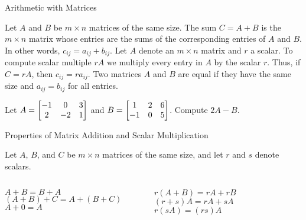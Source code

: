 \documentclass[xcolor=dvipsnames,aspectratio=169,t]{beamer}
\begin{document}
\begin{frame}{Arithmetic with Matrices}

  {\small
  \bi
  \ii Let $A$ and $B$ be $m \times n$ matrices of the same size. The \alert{sum $C=A + B$} is the $m \times n$ matrix whose entries are the sums of the corresponding entries of $A$ and $B$. In other words, $c_{ij} = a_{ij}+b_{ij}$.
  \ii Let $A$ denote an $m \times n$ matrix and $r$ a scalar. To compute \alert{scalar multiple $rA$} we multiply every entry in $A$ by the scalar $r$. Thus, if $C = rA$, then $c_{ij} = r a_{ij}$.
  \ii Two matrices $A$ and $B$ are equal if they have the same size and $a_{ij}=b_{ij}$ for all entries.
  \ei
  }

  \pause
  \begin{example}
  Let $\displaystyle A = \begin{bmatrix} -1 & 0 & 3\\ 2 & -2 & 1 \end{bmatrix}$ and $\displaystyle B = \begin{bmatrix} 1 & 2 & 6\\ -1 & 0 & 5 \end{bmatrix}$.  Compute $2A - B$.
  \end{example}
\end{frame}

\begin{frame}{Properties of Matrix Addition and Scalar Multiplication}

\bbox
Let $A$, $B$, and $C$ be $m \times n$ matrices of the same size, and let $r$ and $s$ denote scalars.

\begin{columns}[T]
\column{0.5\tw}
\bb[a.]
\ii $A+B = B+A$
\ii $(A+B)+C = A+(B+C)$
\ii $A + 0 = A$
\ee

\column{0.5\tw}
\bb[a.]
\addtocounter{enumi}{3}
\ii $r(A+B) = rA + rB$
\ii $(r+s) A = rA + sA$
\ii $r(sA) = (rs)A$
\ee
\end{columns}
\ebox

\end{frame}
\end{document}
